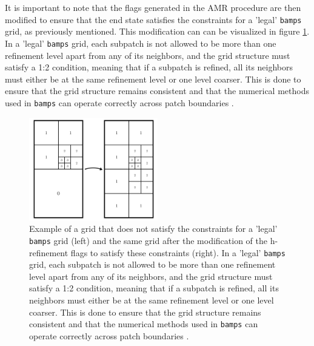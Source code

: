 It is important to note that the flags generated in the AMR procedure are then modified to ensure that the end state satisfies the constraints for a 'legal' \texttt{bamps} grid, as previously mentioned. This modification can can be visualized in figure \ref{fig:amr_legal}. In a 'legal' \texttt{bamps} grid, each subpatch is not allowed to be more than one refinement level apart from any of its neighbors, and the grid structure must satisfy a 1:2 condition, meaning that if a subpatch is refined, all its neighbors must either be at the same refinement level or one level coarser. This is done to ensure that the grid structure remains consistent and that the numerical methods used in \texttt{bamps} can operate correctly across patch boundaries \cite{Adaptive_hp_refinement_for_spectral_elements_in_numerical_relativity}.

\begin{figure}[t!]
    \centering
    \includegraphics[width=0.5\textwidth]{Figures/AMR.png}
    \caption{Example of a grid that does not satisfy the constraints for a 'legal' \texttt{bamps} grid (left) and the same grid after the modification of the h-refinement flags to satisfy these constraints (right). In a 'legal' \texttt{bamps} grid, each subpatch is not allowed to be more than one refinement level apart from any of its neighbors, and the grid structure must satisfy a 1:2 condition, meaning that if a subpatch is refined, all its neighbors must either be at the same refinement level or one level coarser. This is done to ensure that the grid structure remains consistent and that the numerical methods used in \texttt{bamps} can operate correctly across patch boundaries \cite{Adaptive_hp_refinement_for_spectral_elements_in_numerical_relativity}.}
    \label{fig:amr_legal}
\end{figure}